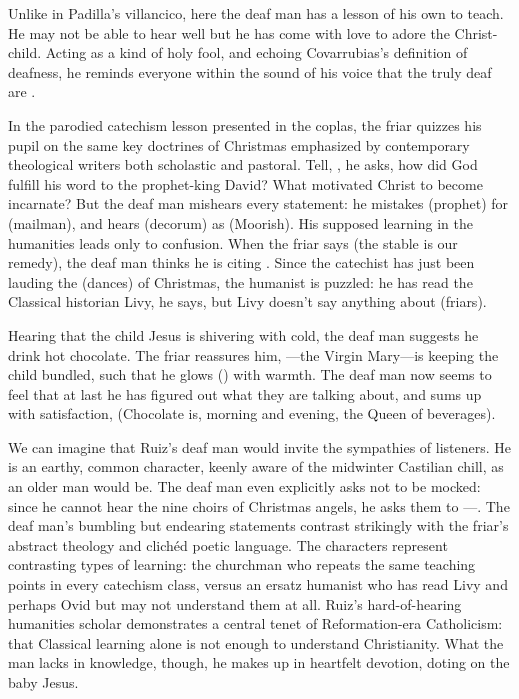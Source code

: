 Unlike in Padilla's villancico, here the deaf man has a lesson of his own to
teach.
He may not be able to hear well but he has come with love to adore the
Christ-child.
Acting as a kind of holy fool, and echoing Covarrubias's definition of deafness,
he reminds everyone within the sound of his voice that the truly deaf are
.

In the parodied catechism lesson presented in the coplas, the friar quizzes his
pupil on the same key doctrines of Christmas emphasized by contemporary
theological writers both scholastic and pastoral.%
    \Autocite[179--203]{Cashner:PhD}
Tell, , he asks, how did God fulfill his word to the
prophet-king David?  
What motivated Christ to become incarnate? 
But the deaf man mishears every statement: he mistakes 
(prophet) for  (mailman), and hears 
(decorum) as  (Moorish).
His supposed learning in the humanities leads only to confusion.
When the friar says  (the stable is our
remedy), the deaf man thinks he is citing .
Since the catechist has just been lauding the  (dances) of
Christmas, the humanist is puzzled: he has read the Classical historian Livy, he
says, but Livy doesn't say anything about  (friars).

Hearing that the child Jesus is shivering with cold, the deaf man suggests he
drink hot chocolate.
The friar reassures him, ---the Virgin Mary---is keeping the
child bundled, such that he glows () with warmth.
The deaf man now seems to feel that at last he has figured out what they are
talking about, and sums up with satisfaction,  (Chocolate is, morning and evening, the Queen of
beverages).


We can imagine that Ruiz's deaf man would invite the sympathies of listeners.
He is an earthy, common character, keenly aware of the midwinter Castilian
chill, as an older man would be.
The deaf man even explicitly asks not to be mocked: since he cannot hear the
nine choirs of Christmas angels, he asks them to ---.
The deaf man's bumbling but endearing statements contrast strikingly with the
friar's abstract theology and clichéd poetic language.
The characters represent contrasting types of learning: the churchman who
repeats the same teaching points in every catechism class, versus an ersatz
humanist who has read Livy and perhaps Ovid but may not understand them at all.
Ruiz's hard-of-hearing humanities scholar demonstrates a central tenet of
Reformation-era Catholicism: that Classical learning alone is not enough to
understand Christianity.%
    \Autocite[206]{Erasmus:Dolan}
What the man lacks in knowledge, though, he makes up in heartfelt devotion,
doting on the baby Jesus.

